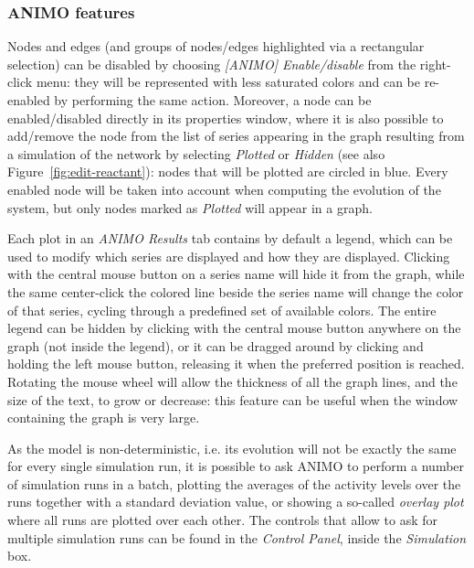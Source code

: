 \subsubsection{ANIMO features}
Nodes and edges (and groups of nodes/edges highlighted via a rectangular selection)
can be disabled by choosing \emph{[ANIMO] Enable/disable} from
the right-click menu: they will be represented with less saturated colors and can be re-enabled by performing
the same action. Moreover, a node can be enabled/disabled directly in its properties window, where it is
also possible to add/remove the node from the list of series appearing in the graph resulting from a simulation
of the network by selecting \emph{Plotted} or \emph{Hidden} (see also Figure~\ref{fig:edit-reactant}):
nodes that will be plotted are circled in blue.
Every enabled node will be taken into account when computing the evolution of the system,
but only nodes marked as \emph{Plotted} will appear in a graph.

Each plot in an \emph{ANIMO Results} tab contains by default a legend, which can be used to modify which series are
displayed and how they are displayed. Clicking with the central mouse button on a series name will hide it from the
graph, while the same center-click the colored line beside the series name will change the color of that series,
cycling through a predefined set of available colors. The entire legend can be hidden by clicking with the
central mouse button anywhere on the graph (not inside the legend), or it can be dragged around by clicking and holding the left
mouse button, releasing it when the preferred position is reached. Rotating the mouse wheel will allow the thickness of all
the graph lines, and the size of the text, to grow or decrease: this feature can be useful when the window containing
the graph is very large.

As the model is non-deterministic, i.e. its
evolution will not be exactly the same for every single simulation run, it is possible to ask ANIMO to perform
a number of simulation runs in a batch, plotting the averages of the activity levels over the runs together with a standard
deviation value, or showing a so-called \emph{overlay plot} where all runs are plotted over each other. The controls
that allow to ask for multiple simulation runs can be found in the \emph{Control Panel}, inside the \emph{Simulation} box.

